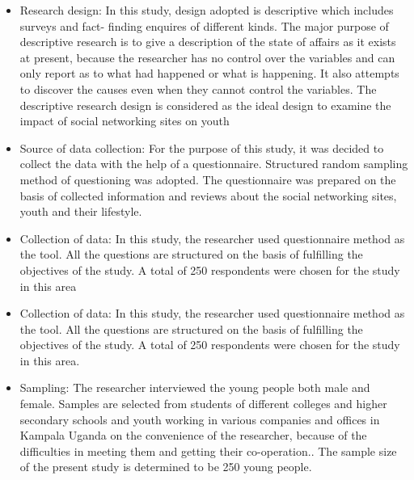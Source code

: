\documentclass[options]{article}
\begin{document}
\begin{itemize}
\item Research design:
In this study, design adopted is descriptive which includes surveys and fact- finding enquires of different kinds. The major purpose of descriptive research is to give a description of the state of affairs as it exists at present, because the researcher has no control over the variables and can only report as to what had happened or what is happening. It also attempts to discover the causes even when they cannot control the variables. The descriptive research design is considered as the ideal design to examine the impact of social networking sites on youth

\item  Source of data collection:
For the purpose of this study, it was decided to collect the data with the help of a questionnaire. Structured random sampling method of questioning was adopted. The questionnaire was prepared on the basis of collected information and reviews about the social networking sites, youth and their lifestyle.

\item Collection of data:
In this study, the researcher used questionnaire method as the tool. All the questions are structured on the basis of fulfilling the objectives of the study. A total of 250 respondents were chosen for the study in this area

\item Collection of data:
In this study, the researcher used questionnaire method as the tool. All the questions are structured on the basis of fulfilling the objectives of the study. A total of 250 respondents were chosen for the study in this area.

\item  Sampling:
The researcher interviewed the young people both male and female. Samples are selected from students of different colleges and higher secondary schools and youth working in various companies and offices in Kampala Uganda on the convenience of the researcher, because of the difficulties in meeting them and getting their co-operation.. The sample size of the present study is determined to be 250 young people.
\end{itemize}
\end{document}
